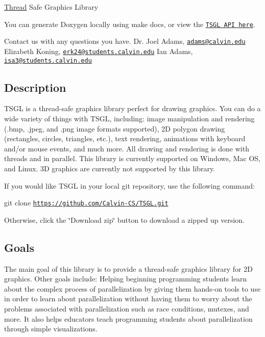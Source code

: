 \hyperlink{class_thread}{Thread} Safe Graphics Library

You can generate Doxygen locally using \textquotesingle{}make docs\textquotesingle{}, or view the \href{http://calvin-cs.github.io/TSGL/html/index.html}{\tt T\+S\+GL A\+PI here}.

Contact us with any questions you have. Dr. Joel Adams, \href{mailto:adams@calvin.edu}{\tt adams@calvin.\+edu} Elizabeth Koning, \href{mailto:erk24@students.calvin.edu}{\tt erk24@students.\+calvin.\+edu} Ian Adams, \href{mailto:isa3@students.calvin.edu}{\tt isa3@students.\+calvin.\+edu} 

 \subsection*{Description }

T\+S\+GL is a thread-\/safe graphics library perfect for drawing graphics. You can do a wide variety of things with T\+S\+GL, including\+: image manipulation and rendering (.bmp, .jpeg, and .png image formats supported), 2D polygon drawing (rectangles, circles, triangles, etc.), text rendering, animations with keyboard and/or mouse events, and much more. All drawing and rendering is done with threads and in parallel. This library is currently supported on Windows, Mac OS, and Linux. 3D graphics are currently not supported by this library.

If you would like T\+S\+GL in your local git repository, use the following command\+:

git clone \href{https://github.com/Calvin-CS/TSGL.git}{\tt https\+://github.\+com/\+Calvin-\/\+C\+S/\+T\+S\+G\+L.\+git}

Otherwise, click the \char`\"{}\+Download zip\char`\"{} button to download a zipped up version. 

 \subsection*{Goals }

The main goal of this library is to provide a thread-\/safe graphics library for 2D graphics. Other goals include\+: Helping beginning programming students learn about the complex process of parallelization by giving them hands-\/on tools to use in order to learn about parallelization without having them to worry about the problems associated with parallelization such as race conditions, mutexes, and more. It also helps educators teach programming students about parallelization through simple visualizations. 

